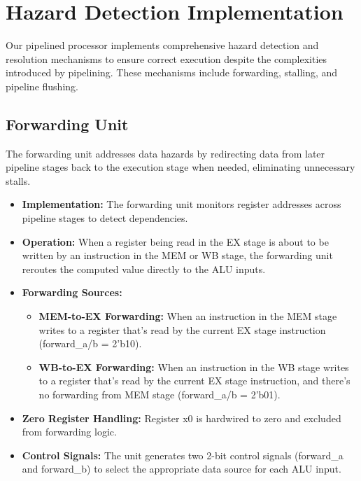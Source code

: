 \documentclass[conference]{IEEEtran}
\begin{document}
\section{Hazard Detection Implementation}

Our pipelined processor implements comprehensive hazard detection and resolution mechanisms to ensure correct execution despite the complexities introduced by pipelining. These mechanisms include forwarding, stalling, and pipeline flushing.

\subsection{Forwarding Unit}
The forwarding unit addresses data hazards by redirecting data from later pipeline stages back to the execution stage when needed, eliminating unnecessary stalls.

\begin{itemize}
    \item \textbf{Implementation:} The forwarding unit monitors register addresses across pipeline stages to detect dependencies.
    
    \item \textbf{Operation:} When a register being read in the EX stage is about to be written by an instruction in the MEM or WB stage, the forwarding unit reroutes the computed value directly to the ALU inputs.
    
    \item \textbf{Forwarding Sources:}
    \begin{itemize}
        \item \textbf{MEM-to-EX Forwarding:} When an instruction in the MEM stage writes to a register that's read by the current EX stage instruction (forward\_a/b = 2'b10).
        
        \item \textbf{WB-to-EX Forwarding:} When an instruction in the WB stage writes to a register that's read by the current EX stage instruction, and there's no forwarding from MEM stage (forward\_a/b = 2'b01).
    \end{itemize}
    
    \item \textbf{Zero Register Handling:} Register x0 is hardwired to zero and excluded from forwarding logic.
    
    \item \textbf{Control Signals:} The unit generates two 2-bit control signals (forward\_a and forward\_b) to select the appropriate data source for each ALU input.
\end{itemize}
\end{document}
